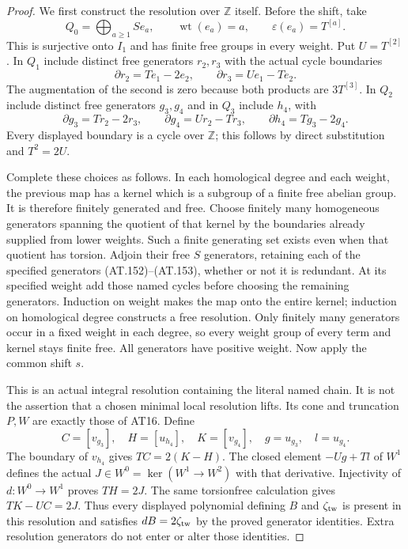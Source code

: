 \begin{proof}
We first construct the resolution over $\mathbb Z$ itself.
Before the shift, take
\[
 Q_0=\bigoplus_{a\geq1}S e_a,\qquad
       \operatorname{wt}(e_a)=a,\qquad
       \varepsilon(e_a)=T^{[a]}.
 \tag{AT.151}
\]
This is surjective onto $I_1$ and has finite free groups
in every weight.
Put $U=T^{[2]}$.
In $Q_1$ include distinct free generators $r_2,r_3$
with the actual cycle boundaries
\[
                 \partial r_2=Te_1-2e_2,\qquad
                 \partial r_3=Ue_1-Te_2.
 \tag{AT.152}
\]
The augmentation of the second is zero because both
products are $3T^{[3]}$.
In $Q_2$ include distinct free generators $g_3,g_4$
and in $Q_3$ include $h_4$, with
\[
 \partial g_3=Tr_2-2r_3,\qquad
 \partial g_4=Ur_2-Tr_3,\qquad
 \partial h_4=Tg_3-2g_4.
 \tag{AT.153}
\]
Every displayed boundary is a cycle over $\mathbb Z$;
this follows by direct substitution and $T^2=2U$.

Complete these choices as follows. In each homological
degree and each weight, the previous map has a kernel
which is a subgroup of a finite free abelian group.
It is therefore finitely generated and free.
Choose finitely many homogeneous generators spanning
the quotient of that kernel by the boundaries already
supplied from lower weights. Such a finite generating
set exists even when that quotient has torsion.
Adjoin their free $S$ generators, retaining each of the
specified generators (AT.152)--(AT.153), whether or not
it is redundant. At its specified weight add those
named cycles before choosing the remaining generators.
Induction on weight makes the map onto the entire
kernel; induction on homological degree constructs
a free resolution. Only finitely many generators
occur in a fixed weight in each degree, so every
weight group of every term and kernel stays finite
free. All generators have positive weight.
Now apply the common shift $s$.

This is an actual integral resolution containing the
literal named chain. It is not the assertion that a
chosen minimal local resolution lifts.
Its cone and truncation $P,W$ are exactly those of
AT16. Define
\[
 C=[v_{g_3}],\quad H=[u_{h_4}],\quad K=[v_{g_4}],
 \quad g=u_{g_3},\quad l=u_{g_4}.
\]
The boundary of $v_{h_4}$ gives $TC=2(K-H)$.
The closed element $-Ug+Tl$ of $W^1$ defines the actual
$J\in W^0=\ker(W^1\to W^2)$ with that derivative.
Injectivity of $d:W^0\to W^1$ proves $TH=2J$.
The same torsionfree calculation gives $TK-UC=2J$.
Thus every displayed polynomial defining $B$ and
$\zeta_{\rm tw}$ is present in this resolution and
satisfies $dB=2\zeta_{\rm tw}$ by the proved generator
identities. Extra resolution generators do not enter
or alter those identities.


\end{proof}
